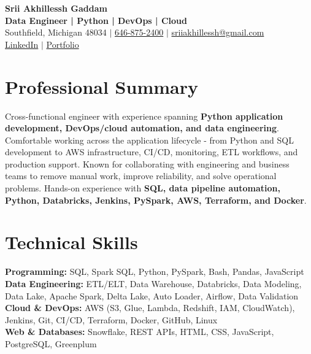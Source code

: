 \documentclass[letterpaper,10pt]{article}
\begin{document}
\fontsize{9.35pt}{10.45pt}\selectfont

\begin{center}
    {\LARGE \textbf{Srii Akhillessh Gaddam}} \\[-1pt]
    \textbf{Data Engineer | Python | DevOps | Cloud} \\[2pt]
    Southfield, Michigan 48034 $|$
    \href{tel:6468752400}{646-875-2400} $|$
    \href{mailto:sriiakhillessh@gmail.com}{sriiakhillessh@gmail.com} \\[1pt]
    \href{https://www.linkedin.com/in/srii-akhiilessh-gaddam-b48668191/}{LinkedIn} $|$
    \href{https://sriiakhillesshg.github.io/portfolio/}{Portfolio}
\end{center}
\vspace{-8pt}

\section{Professional Summary}
\small{Cross-functional engineer with experience spanning \textbf{Python application development, DevOps/cloud automation, and data engineering}. Comfortable working across the application lifecycle - from Python and SQL development to AWS infrastructure, CI/CD, monitoring, ETL workflows, and production support. Known for collaborating with engineering and business teams to remove manual work, improve reliability, and solve operational problems. Hands-on experience with \textbf{SQL, data pipeline automation, Python, Databricks, Jenkins, PySpark, AWS, Terraform, and Docker}.}

\section{Technical Skills}
\small{
\textbf{Programming:} SQL, Spark SQL, Python, PySpark, Bash, Pandas, JavaScript \\
\textbf{Data Engineering:} ETL/ELT, Data Warehouse, Databricks, Data Modeling, Data Lake, Apache Spark, Delta Lake, Auto Loader, Airflow, Data Validation \\
\textbf{Cloud \& DevOps:} AWS (S3, Glue, Lambda, Redshift, IAM, CloudWatch), Jenkins, Git, CI/CD, Terraform, Docker, GitHub, Linux \\
\textbf{Web \& Databases:} Snowflake, REST APIs, HTML, CSS, JavaScript, PostgreSQL, Greenplum
}
\end{document}
